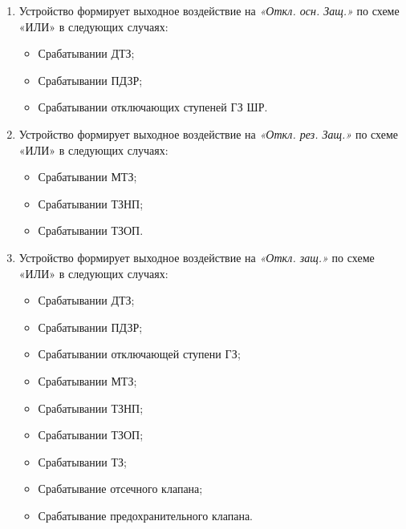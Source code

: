 \color{black}

\begin{enumerate}[label=\arabic{section}.\arabic{subsection}.\arabic*,  align=left, labelsep=4pt, leftmargin=0pt, itemindent=57pt]

\item
Устройство формирует выходное воздействие на \textit{«Откл. осн. Защ.»} по схеме «ИЛИ» в следующих случаях:
\begin{itemize}
\item Срабатывании ДТЗ;
\item Срабатывании ПДЗР;
\item Срабатывании отключающих ступеней ГЗ ШР.
\end{itemize}

\item
Устройство формирует выходное воздействие на \textit{«Откл. рез. Защ.»} по схеме «ИЛИ» в следующих случаях:
\begin{itemize}
\item Срабатывании МТЗ;
\item Срабатывании ТЗНП;
\item Срабатывании ТЗОП.
\end{itemize}

\item
Устройство формирует выходное воздействие на \textit{«Откл. защ.»} по схеме «ИЛИ» в следующих случаях:
\begin{itemize}
\item Срабатывании ДТЗ;
\item Срабатывании ПДЗР;
\item Срабатывании отключающей ступени ГЗ;
\item Срабатывании МТЗ;
\item Срабатывании ТЗНП;
\item Срабатывании ТЗОП;
\item Срабатывании ТЗ;
\item Срабатывание отсечного клапана;
\item Срабатывание предохранительного клапана.
\end{itemize}


\end{enumerate}
